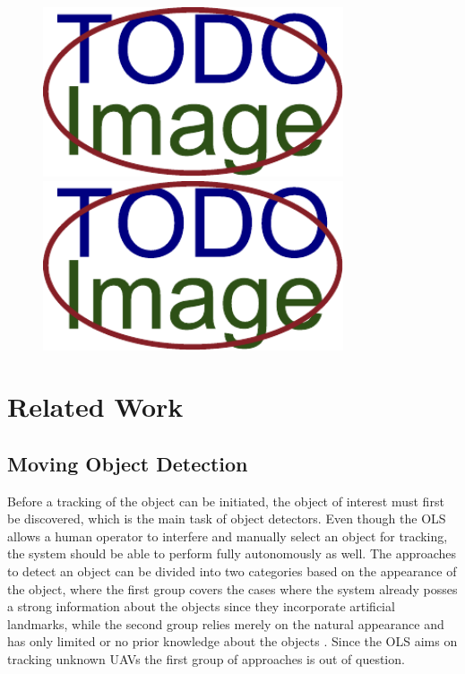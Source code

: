 \begin{figure}[t]\centering %
	\centering
	\includegraphics[width=0.45\linewidth, height=5cm]{fig/placeholder.pdf}
	\includegraphics[width=0.45\linewidth, height=5cm]{fig/placeholder.pdf}
	\caption{}
	\label{fig:WidePicture}
\end{figure}

\vata[4]

\chapter{Related Work}

\section{Moving Object Detection}

Before a tracking of the object can be initiated, the object of interest must first be discovered, which is the main task of object detectors. Even though the OLS allows a human operator to interfere and manually select an object for tracking, the system should be able to perform fully autonomously as well. The approaches to detect an object can be divided into two categories based on the appearance of the object, where the first group covers the cases where the system already posses a strong information about the objects since they incorporate artificial landmarks, while the second group relies merely on the natural appearance and has only limited or no prior knowledge about the objects \cite{Multi-Camera_Sensor_System_for_3D_Segmentation}. Since the OLS aims on tracking unknown UAVs the first group of approaches is out of question.

